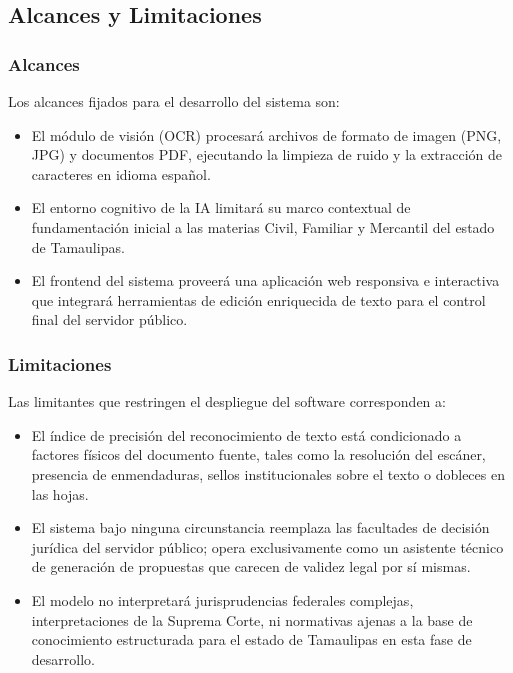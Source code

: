\subsection{Alcances y Limitaciones}
\label{sec:alcances_limitaciones}

\subsubsection{Alcances}
\label{subsec:alcances}

Los alcances fijados para el desarrollo del sistema son:
\begin{itemize}
    \item El módulo de visión (OCR) procesará archivos de formato de imagen (PNG, JPG) y documentos PDF, ejecutando la limpieza de ruido y la extracción de caracteres en idioma español.
    \item El entorno cognitivo de la IA limitará su marco contextual de fundamentación inicial a las materias Civil, Familiar y Mercantil del estado de Tamaulipas.
    \item El frontend del sistema proveerá una aplicación web responsiva e interactiva que integrará herramientas de edición enriquecida de texto para el control final del servidor público.
\end{itemize}

\subsubsection{Limitaciones}
\label{subsec:limitaciones}

Las limitantes que restringen el despliegue del software corresponden a:
\begin{itemize}
    \item El índice de precisión del reconocimiento de texto está condicionado a factores físicos del documento fuente, tales como la resolución del escáner, presencia de enmendaduras, sellos institucionales sobre el texto o dobleces en las hojas.
    \item El sistema bajo ninguna circunstancia reemplaza las facultades de decisión jurídica del servidor público; opera exclusivamente como un asistente técnico de generación de propuestas que carecen de validez legal por sí mismas.
    \item El modelo no interpretará jurisprudencias federales complejas, interpretaciones de la Suprema Corte, ni normativas ajenas a la base de conocimiento estructurada para el estado de Tamaulipas en esta fase de desarrollo.
\end{itemize}

